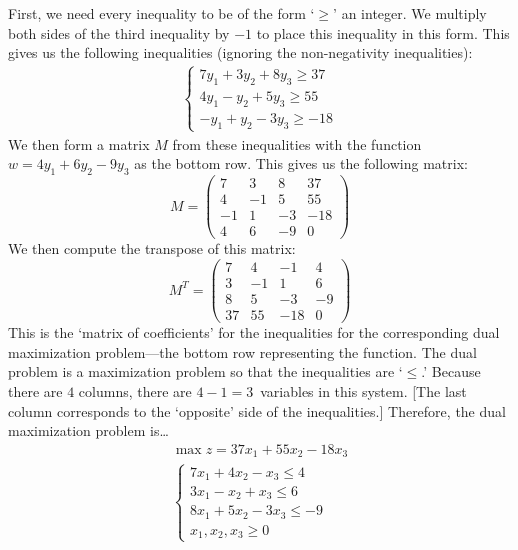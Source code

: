 \documentclass[11pt,letterpaper]{article}
\begin{document}
\sol First, we need every inequality to be of the form `$\geq$' an integer. We multiply both sides of the third inequality by $-1$ to place this inequality in this form. This gives us the following inequalities (ignoring the non-negativity inequalities):
	\[
	\begin{gathered}
	\begin{cases}
	7y_1 + 3y_2 + 8y_3 \geq 37 \\
	4y_1 - y_2 + 5y_3 \geq 55 \\
	-y_1 + y_2 - 3y_3 \geq -18
	\end{cases}
	\end{gathered}
	\]
We then form a matrix $M$ from these inequalities with the function $w= 4y_1 + 6y_2 - 9y_3$ as the bottom row. This gives us the following matrix: 
	\[
	M=
	\begin{pmatrix}
	7 & 3 & 8 & 37 \\
	4 & -1 & 5 & 55 \\
	-1 & 1 & -3 & -18 \\
	4 & 6 & -9 & 0 
	\end{pmatrix}
	\]
We then compute the transpose of this matrix:
	\[
	M^T= 
	\begin{pmatrix}
	7 & 4 & -1 & 4 \\
	3 & -1 & 1 & 6 \\
	8 & 5 & -3 & -9 \\
	37 & 55 & -18 & 0 
	\end{pmatrix}
	\]
This is the `matrix of coefficients' for the inequalities for the corresponding dual maximization problem---the bottom row representing the function. The dual problem is a maximization problem so that the inequalities are `$\leq$.' Because there are $4$ columns, there are $4 - 1= 3$~variables in this system. [The last column corresponds to the `opposite' side of the inequalities.] Therefore, the dual maximization problem is\dots
	\[
	\begin{gathered}
	\max z= 37x_1 + 55x_2 - 18x_3 \\
	\begin{cases}
	7x_1 + 4x_2 - x_3 \leq 4 \\
	3x_1 - x_2 + x_3 \leq 6 \\
	8x_1 + 5x_2 - 3x_3 \leq -9 \\
	x_1, x_2, x_3 \geq 0
	\end{cases}
	\end{gathered}
	\] 
\end{document}
